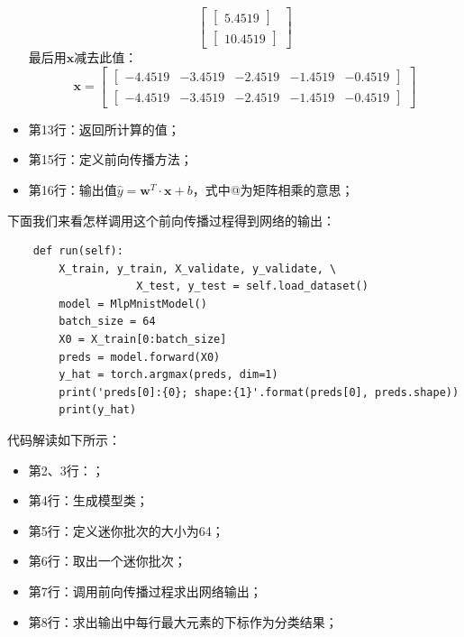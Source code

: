 \documentclass[UTF8]{article}
\begin{document}
\begin{itemize}
\begin{equation}
\begin{bmatrix}
\begin{bmatrix}
5.4519
\end{bmatrix} \\
\begin{bmatrix}
10.4519
\end{bmatrix}
\end{bmatrix}
\label{mlp-e3-input-x-exp-sum-log-unsqueeze}
\end{equation}
最后用$\boldsymbol{x}$减去此值：
\begin{equation}
\boldsymbol{x} = \begin{bmatrix}
\begin{bmatrix}
-4.4519 & -3.4519 & -2.4519 & -1.4519 & -0.4519
\end{bmatrix} \\
\begin{bmatrix}
-4.4519 & -3.4519 & -2.4519 & -1.4519 & -0.4519
\end{bmatrix}
\end{bmatrix}
\label{mlp-e3-input-x-rst}
\end{equation}
\item 第13行：返回所计算的值；
\item 第15行：定义前向传播方法；
\item 第16行：输出值$\hat{y}=\boldsymbol{w}^{T}\cdot \boldsymbol{x} + b$，式中@为矩阵相乘的意思；
\end{itemize}
下面我们来看怎样调用这个前向传播过程得到网络的输出：
\begin{lstlisting}
    def run(self):
        X_train, y_train, X_validate, y_validate, \
                    X_test, y_test = self.load_dataset()
        model = MlpMnistModel()
        batch_size = 64
        X0 = X_train[0:batch_size]
        preds = model.forward(X0)
        y_hat = torch.argmax(preds, dim=1)
        print('preds[0]:{0}; shape:{1}'.format(preds[0], preds.shape))
        print(y_hat)
\end{lstlisting}
代码解读如下所示：
\begin{itemize}
\item 第2、3行：；
\item 第4行：生成模型类；
\item 第5行：定义迷你批次的大小为64；
\item 第6行：取出一个迷你批次；
\item 第7行：调用前向传播过程求出网络输出；
\item 第8行：求出输出中每行最大元素的下标作为分类结果；
\end{itemize}
\end{document}
